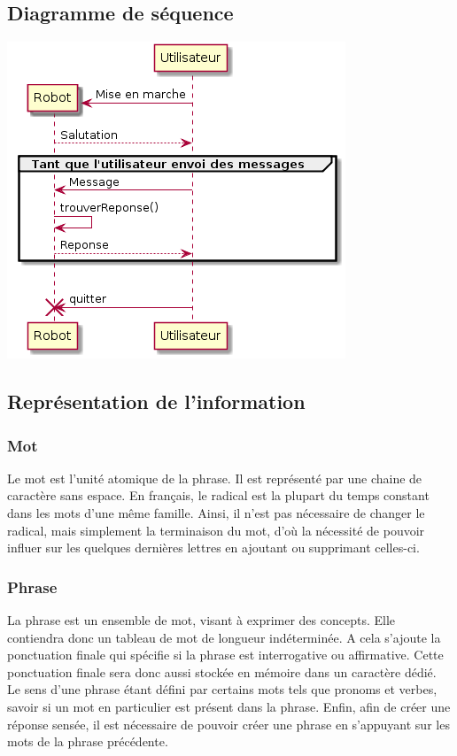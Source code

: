 \subsection{Diagramme de séquence}
\includegraphics[scale=0.5]{diagrammedeSequence.png}
\subsection{Représentation de l'information}
\subsubsection{Mot}
Le mot est l'unité atomique de la phrase. Il est représenté par une chaine de caractère sans espace. En français, le radical est la plupart du temps constant dans les mots d'une même famille. Ainsi, il n'est pas nécessaire de changer le radical, mais simplement la terminaison du mot, d'où la nécessité de pouvoir influer sur les quelques dernières lettres en ajoutant ou supprimant celles-ci.
\subsubsection{Phrase}
La phrase est un ensemble de mot, visant à exprimer des concepts. Elle contiendra donc un tableau de mot de longueur indéterminée. A cela s'ajoute la ponctuation finale qui spécifie si la phrase est interrogative ou affirmative. Cette ponctuation finale sera donc aussi stockée en mémoire dans un caractère dédié. Le sens d'une phrase étant défini par certains mots tels que pronoms et verbes, savoir si un mot en particulier est présent dans la phrase.
Enfin, afin de créer une réponse sensée, il est nécessaire de pouvoir créer une phrase en s'appuyant sur les mots de la phrase précédente.
